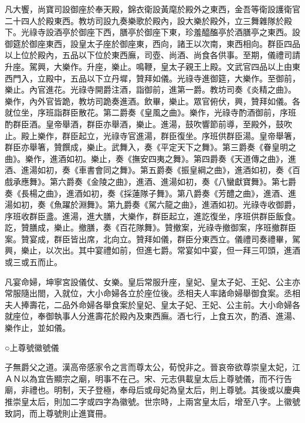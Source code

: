 凡大饗，尚寶司設御座於奉天殿，錦衣衛設黃麾於殿外之東西，金吾等衛設護衛官二十四人於殿東西。教坊司設九奏樂歌於殿內，設大樂於殿外，立三舞雜隊於殿下。光祿寺設酒亭於御座下西，膳亭於御座下東，珍羞醯醢亭於酒膳亭之東西。設御筵於御座東西，設皇太子座於御座東，西向，諸王以次南，東西相向。群臣四品以上位於殿內，五品以下位於東西廡，司壺、尚酒、尚食各供事。至期，儀禮司請升座。駕興，大樂作。升座，樂止。鳴鞭，皇太子親王上殿。文武官四品以上由東西門入，立殿中，五品以下立丹墀，贊拜如儀。光祿寺進御筵，大樂作。至御前，樂止。內官進花。光祿寺開爵注酒，詣御前，進第一爵。教坊司奏《炎精之曲》。樂作，內外官皆跪，教坊司跪奏進酒。飲畢，樂止。眾官俯伏，興，贊拜如儀。各就位坐，序班詣群臣散花。第二爵奏《皇風之曲》。樂作，光祿寺酌酒御前，序班酌群臣酒。皇帝舉酒，群臣亦舉酒，樂止。進湯，鼓吹響節前導，至殿外，鼓吹止。殿上樂作，群臣起立，光祿寺官進湯，群臣復坐。序班供群臣湯。皇帝舉箸，群臣亦舉箸，贊饌成，樂止。武舞入，奏《平定天下之舞》。第三爵奏《眷皇明之曲》。樂作，進酒如初。樂止，奏《撫安四夷之舞》。第四爵奏《天道傳之曲》，進酒、進湯如初，奏《車書會同之舞》。第五爵奏《振皇綱之曲》，進酒如初，奏《百戲承應舞》。第六爵奏《金陵之曲》，進酒、進湯如初，奏《八蠻獻寶舞》。第七爵奏《長楊之曲》，進酒如初，奏《採蓮隊子舞》。第八爵奏《芳醴之曲》，進酒、進湯如初，奏《魚躍於淵舞》。第九爵奏《駕六龍之曲》，進酒如初。光祿寺收御爵，序班收群臣盞。進湯，進大膳，大樂作，群臣起立，進訖復坐，序班供群臣飯食。訖，贊膳成，樂止。撤膳，奏《百花隊舞》。贊撤案，光祿寺撤御案，序班撤群臣案。贊宴成，群臣皆出席，北向立。贊拜如儀，群臣分東西立。儀禮司奏禮畢，駕興，樂止，以次出。其中宴禮如前，但進七爵。常宴如中宴，但一拜三叩頭，進酒或三或五而止。

凡宴命婦，坤寧宮設儀仗、女樂。皇后常服升座，皇妃、皇太子妃、王妃、公主亦常服隨出閤，入就位，大小命婦各立於座位後。丞相夫人率諸命婦舉御食案。丞相夫人捧壽花，二品外命婦各舉食案於皇妃、皇太子妃、王妃、公主前。大小命婦各就座位，奉御執事人分進壽花於殿內及東西廡。酒七行，上食五次，酌酒、進湯、樂作止，並如儀。

○上尊號徽號儀

子無爵父之道。漢高帝感家令之言而尊太公，荀悅非之。晉哀帝欲尊崇皇太妃，江ＡＮ以為宜告顯宗之廟，明事不在己。宋、元志俱載皇太后上尊號儀，而不行告廟，非禮也。明制，天子登極，奉母后或母妃為皇太后，則上尊號。其後或以慶典推崇皇太后，則加二字或四字為徽號。世宗時，上兩宮皇太后，增至八字。上徽號致詞，而上尊號則止進寶冊。

